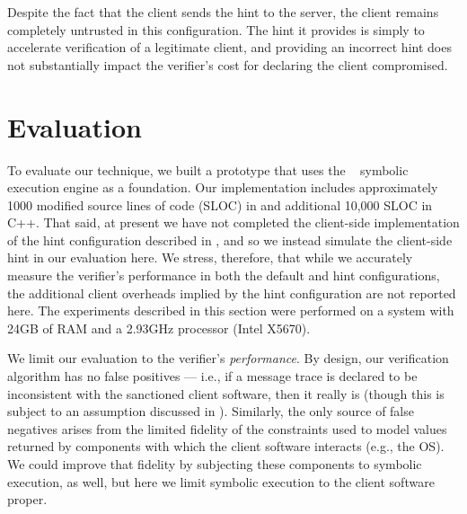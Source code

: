 Despite the fact that the client sends the hint to the server, the
client remains completely untrusted in this configuration.  The hint
it provides is simply to accelerate verification of a legitimate
client, and providing an incorrect hint does not substantially impact
the verifier's cost for declaring the client compromised.  

\section{Evaluation}
\label{sec:guided:eval}
\label{sec:guided:eval:apps}

To evaluate our technique, we built a prototype that uses the
\klee~\cite{cadar08:klee} symbolic execution engine as a foundation.
Our implementation includes approximately 1000 modified source lines
of code (SLOC) in \klee
and additional 10,000 SLOC in C++.  That said, at present we have not
completed the client-side implementation of the hint configuration
described in , and so we instead
simulate the client-side hint in our evaluation here.  We stress,
therefore, that while we accurately measure the verifier's performance
in both the default and hint configurations, the additional client
overheads implied by the hint configuration are not reported here.  
The experiments described in this section were performed on a system
with 24GB of RAM and a 2.93GHz processor (Intel X5670).

We limit our evaluation to the verifier's \textit{performance}.
By design, our verification
algorithm has no false positives --- i.e., if a message trace is
declared to be inconsistent with the sanctioned client software, then
it really is (though this is subject to an assumption discussed in
).  Similarly, the only source
of false negatives arises from the limited fidelity of the constraints
used to model values returned by components with which the client
software interacts (e.g., the OS).  We could improve that fidelity by
subjecting these components to symbolic execution, as well, but here
we limit symbolic execution to the client software proper.

